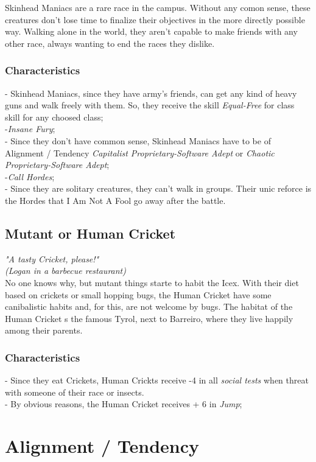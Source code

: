 \documentclass[ letterpaper,12pt]{article}
\begin{document}
Skinhead Maniacs are a rare race in the campus. Without any comon sense, these creatures don't lose time to finalize their objectives in the more directly possible way. Walking alone in the world, they aren't capable to make friends with any other race, always wanting to end the races they dislike.

\subsubsection{Characteristics}
- Skinhead Maniacs, since they have army's friends, can get any kind of heavy guns and walk freely with them. So, they receive the skill {\it Equal-Free} for class skill for any choosed class;\\
-{\it Insane Fury};\\
- Since they don't have common sense, Skinhead Maniacs have to be of Alignment / Tendency {\it Capitalist Proprietary-Software Adept} or {\it Chaotic Proprietary-Software Adept};\\
-{\it Call Hordes};\\
- Since they are solitary creatures, they can't walk in groups. Their unic reforce is the Hordes that I Am Not A Fool go away after the battle.

\subsection{Mutant or Human Cricket}
{\it "A tasty Cricket, please!"\\
(Logan in a barbecue restaurant)}\\

No one knows why, but mutant things starte to habit the Icex. With their diet based on crickets or small hopping bugs, the Human Cricket have some canibalistic habits and, for this, are not welcome by bugs. The habitat of the Human Cricket s the famous Tyrol, next to Barreiro, where they live happily among their parents.

\subsubsection{Characteristics}
- Since they eat Crickets, Human Crickts receive -4 in all {\it social tests} when threat with someone of their race or insects.\\
- By obvious reasons, the Human Cricket receives + 6 in {\it Jump};\\


\section{Alignment / Tendency}
\end{document}
